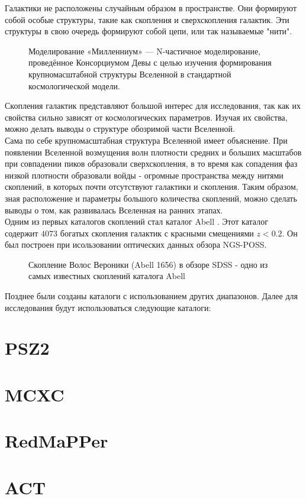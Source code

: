 \Introduction

Галактики не расположены случайным образом в пространстве. Они формируют собой особые структуры, 
такие как скопления и сверхскопления галактик. Эти структуры в свою очередь формируют собой цепи, 
или так называемые "нити".\\

\begin{figure}
    \caption{Моделирование «Милленниум» — N-частичное моделирование, проведённое Консорциумом 
        Девы с целью изучения формирования крупномасштабной структуры Вселенной в стандартной
        космологической модели.}
\end{figure}

Скопления галактик представляют большой интерес для исследования, так как их свойства сильно зависят 
от космологических параметров. Изучая их свойства, можно делать выводы о структуре обозримой части 
Вселенной.\\

Сама по себе крупномасштабная структура Вселенной имеет объяснение. При появлении Вселенной 
возмущения волн плотности средних и больших масштабов при совпадении пиков образовали сверхскопления,
в то время как сопадения фаз низкой плотности образовали войды - огромные пространства между нитями 
скоплений, в которых почти отсутствуют галактики и скопления. Таким образом, зная расположение и 
параметры большого количества скоплений, можно сделать выводы о том, как развивалась Вселенная на 
ранних этапах.\\

Одним из первых каталогов скоплений стал каталог Abell \cite{Abell}. Этот каталог содержит $4073$ 
богатых скопления галактик с красными смещениями $z < 0.2$. Он был построен при исользовании 
оптических данных обзора NGS-POSS.\\

\begin{figure}
    \caption{Скопление Волос Вероники (Abell 1656) в обзоре SDSS - одно из самых известных 
        скоплений каталога Abell}
\end{figure}

Позднее были созданы каталоги с использованием других диапазонов. Далее для исследования будут 
использоваться следующие каталоги:\\

\section{PSZ2}

\section{MCXC}

\section{RedMaPPer}

\section{ACT}

